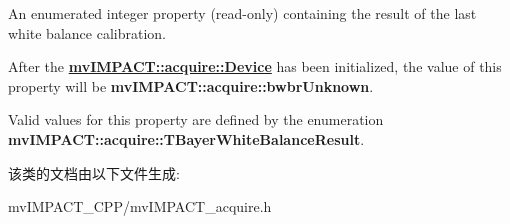 An enumerated integer property {\bfseries }(read-\/only) containing the result of the last white balance calibration. 

After the {\bfseries \hyperlink{classmv_i_m_p_a_c_t_1_1acquire_1_1_device}{mv\+I\+M\+P\+A\+C\+T\+::acquire\+::\+Device}} has been initialized, the value of this property will be {\bfseries mv\+I\+M\+P\+A\+C\+T\+::acquire\+::bwbr\+Unknown}.

Valid values for this property are defined by the enumeration {\bfseries mv\+I\+M\+P\+A\+C\+T\+::acquire\+::\+T\+Bayer\+White\+Balance\+Result}. 

该类的文档由以下文件生成\+:\begin{DoxyCompactItemize}
\item 
mv\+I\+M\+P\+A\+C\+T\+\_\+\+C\+P\+P/mv\+I\+M\+P\+A\+C\+T\+\_\+acquire.\+h\end{DoxyCompactItemize}
